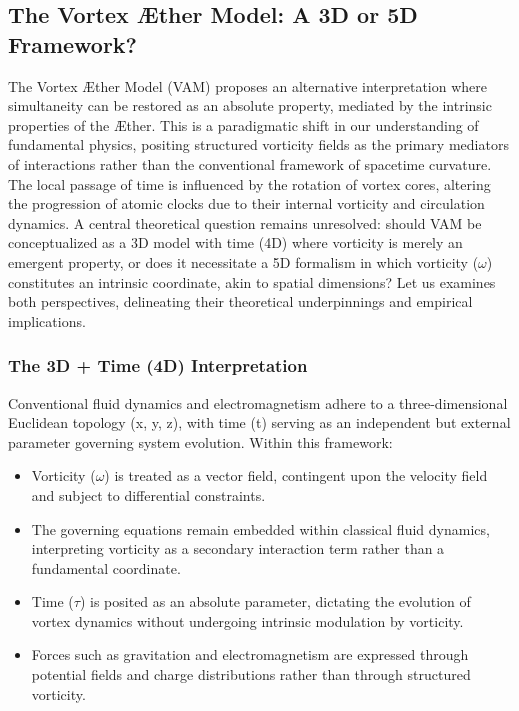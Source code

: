 
\subsection{The Vortex Æther Model: A 3D or 5D Framework?}\label{subsec:the-vortex-ther-model:-a-3d-or-5d-framework?}
The Vortex Æther Model (VAM) proposes an alternative interpretation where simultaneity can be restored as an absolute property, mediated by the intrinsic properties of the Æther.
This is a paradigmatic shift in our understanding of fundamental physics, positing structured vorticity fields as the primary mediators of interactions rather than the conventional framework of spacetime curvature.
The local passage of time is influenced by the rotation of vortex cores, altering the progression of atomic clocks due to their internal vorticity and circulation dynamics.
A central theoretical question remains unresolved: should VAM be conceptualized as a 3D model with time (4D) where vorticity is merely an emergent property, or does it necessitate a 5D formalism in which vorticity ($\omega$) constitutes an intrinsic coordinate, akin to spatial dimensions?
Let us examines both perspectives, delineating their theoretical underpinnings and empirical implications.

\subsubsection*{The 3D + Time (4D) Interpretation}
Conventional fluid dynamics and electromagnetism adhere to a three-dimensional Euclidean topology (x, y, z), with time (t) serving as an independent but external parameter governing system evolution.
Within this framework:

\begin{itemize}
    \item Vorticity ($\omega$) is treated as a vector field, contingent upon the velocity field and subject to differential constraints.
    \item The governing equations remain embedded within classical fluid dynamics, interpreting vorticity as a secondary interaction term rather than a fundamental coordinate.
    \item Time ($\tau$) is posited as an absolute parameter, dictating the evolution of vortex dynamics without undergoing intrinsic modulation by vorticity.
    \item Forces such as gravitation and electromagnetism are expressed through potential fields and charge distributions rather than through structured vorticity.
\end{itemize}


